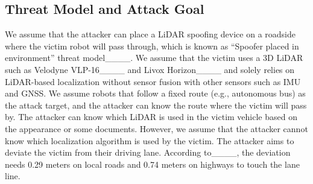 \subsection{Threat Model and Attack Goal}
We assume that the attacker can place a LiDAR spoofing device on a roadside where the victim robot will pass through, which is known as ``Spoofer placed in environment'' threat model____. We assume that the victim uses a 3D LiDAR such as Velodyne VLP-16____ and Livox Horizon____ and solely relies on LiDAR-based localization without sensor fusion with other sensors such as IMU and GNSS.  
We assume robots that follow a fixed route (e.g., autonomous bus) as the attack target, and the attacker can know the route where the victim will pass by.
The attacker can know which LiDAR is used in the victim vehicle based on the appearance or some documents. However, we assume that the attacker cannot know which localization algorithm is used by the victim. The attacker aims to deviate the victim from their driving lane. According to____, the deviation needs 0.29 meters on local roads and 0.74 meters on highways to touch the lane line.

